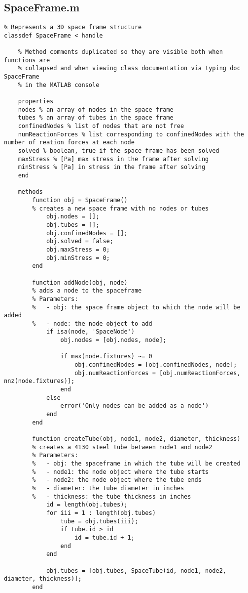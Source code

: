 		\subsection{SpaceFrame.m}
\begin{lstlisting}
% Represents a 3D space frame structure
classdef SpaceFrame < handle
	
	% Method comments duplicated so they are visible both when functions are
	% collapsed and when viewing class documentation via typing doc SpaceFrame
	% in the MATLAB console
	
	properties
	nodes % an array of nodes in the space frame
	tubes % an array of tubes in the space frame
	confinedNodes % list of nodes that are not free
	numReactionForces % list corresponding to confinedNodes with the number of reation forces at each node
	solved % boolean, true if the space frame has been solved
	maxStress % [Pa] max stress in the frame after solving
	minStress % [Pa] in stress in the frame after solving
	end
	
	methods
		function obj = SpaceFrame()
		% creates a new space frame with no nodes or tubes
			obj.nodes = [];
			obj.tubes = [];
			obj.confinedNodes = [];
			obj.solved = false;
			obj.maxStress = 0;
			obj.minStress = 0;
		end         
		
		function addNode(obj, node)
		% adds a node to the spaceframe
		% Parameters:
		%   - obj: the space frame object to which the node will be added
		%   - node: the node object to add
			if isa(node, 'SpaceNode')
				obj.nodes = [obj.nodes, node];
			
				if max(node.fixtures) ~= 0
					obj.confinedNodes = [obj.confinedNodes, node];
					obj.numReactionForces = [obj.numReactionForces, nnz(node.fixtures)];
				end
			else
				error('Only nodes can be added as a node')
			end
		end
		
		function createTube(obj, node1, node2, diameter, thickness)
		% creates a 4130 steel tube between node1 and node2
		% Parameters:
		%   - obj: the spaceframe in which the tube will be created
		%   - node1: the node object where the tube starts
		%   - node2: the node object where the tube ends
		%   - diameter: the tube diameter in inches
		%   - thickness: the tube thickness in inches
			id = length(obj.tubes);
			for iii = 1 : length(obj.tubes)
				tube = obj.tubes(iii);
				if tube.id > id
					id = tube.id + 1;
				end
			end
		
			obj.tubes = [obj.tubes, SpaceTube(id, node1, node2, diameter, thickness)];
		end
		

\end{lstlisting}
